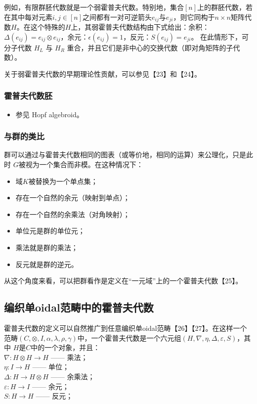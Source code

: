 例如，有限群胚代数就是一个弱霍普夫代数。特别地，集合$[n]$上的群胚代数，若在其中每对元素$i, j \in [n]$之间都有一对可逆箭头$e_{ij}$与$e_{ji}$，则它同构于$n \times n$矩阵代数$H$。在这个特殊的$H$上，其弱霍普夫代数结构由下式给出：余积：$\Delta(e_{ij}) = e_{ij} \otimes e_{ij}$，余元：$\epsilon(e_{ij}) = 1$，反元：$S(e_{ij}) = e_{ji}$。
在此情形下，可分子代数 $H_L$ 与 $H_R$ 重合，并且它们是非中心的交换代数（即对角矩阵的子代数）。

关于弱霍普夫代数的早期理论性贡献，可以参见【23】和【24】。
\subsubsection{霍普夫代数胚}
\begin{itemize}
\item 参见 Hopf algebroid。
\end{itemize}
\subsubsection{与群的类比}
群可以通过与霍普夫代数相同的图表（或等价地，相同的运算）来公理化，只是此时 $G$被视为一个集合而非模。在这种情况下：
\begin{itemize}
\item 域$K$被替换为一个单点集；
\item 存在一个自然的余元（映射到单点）；
\item 存在一个自然的余乘法（对角映射）；
\item 单位元是群的单位元；
\item 乘法就是群的乘法；
\item 反元就是群的逆元。
\end{itemize}
从这个角度来看，可以把群看作是定义在“一元域”上的一个霍普夫代数【25】。
\subsection{编织单oidal范畴中的霍普夫代数}
霍普夫代数的定义可以自然推广到任意编织单oidal范畴【26】【27】。在这样一个范畴$(C, \otimes, I, \alpha, \lambda, \rho, \gamma)$中，一个霍普夫代数是一个六元组$(H, \nabla, \eta, \Delta, \varepsilon, S)$，其中 $H$是$C$中的一个对象，并且：\\
$\nabla : H \otimes H \to H$ —— 乘法；\\
$\eta : I \to H$ —— 单位；\\
$\Delta : H \to H \otimes H$ —— 余乘法；\\
$\varepsilon : H \to I$ —— 余元；\\
$S : H \to H$ —— 反元；

